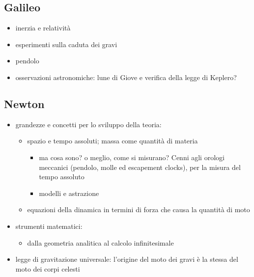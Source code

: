 \documentclass[letterpaper,10pt,italian]{jupyterBook}
\begin{document}
\subsection{Galileo}
\label{\detokenize{ch/mechanics/intro:galileo}}\begin{itemize}
\item {} 
\sphinxAtStartPar
inerzia e relatività

\item {} 
\sphinxAtStartPar
esperimenti sulla caduta dei gravi

\item {} 
\sphinxAtStartPar
pendolo

\item {} 
\sphinxAtStartPar
osservazioni astronomiche: lune di Giove e verifica della legge di Keplero?

\end{itemize}


\subsection{Newton}
\label{\detokenize{ch/mechanics/intro:newton}}\begin{itemize}
\item {} 
\sphinxAtStartPar
grandezze e concetti per lo sviluppo della teoria:
\begin{itemize}
\item {} 
\sphinxAtStartPar
spazio e tempo assoluti; massa come quantità di materia
\begin{itemize}
\item {} 
\sphinxAtStartPar
ma cosa sono? o meglio, come si misurano? Cenni agli orologi meccanici (pendolo, molle ed escapement clocks), per la misura del tempo assoluto

\item {} 
\sphinxAtStartPar
modelli e astrazione

\end{itemize}

\item {} 
\sphinxAtStartPar
equazioni della dinamica in termini di forza che causa la quantità di moto

\end{itemize}

\item {} 
\sphinxAtStartPar
strumenti matematici:
\begin{itemize}
\item {} 
\sphinxAtStartPar
dalla geometria analitica al calcolo infinitesimale

\end{itemize}

\item {} 
\sphinxAtStartPar
legge di gravitazione universale: l’origine del moto dei gravi è la stessa del moto dei corpi celesti

\end{itemize}
\end{document}

